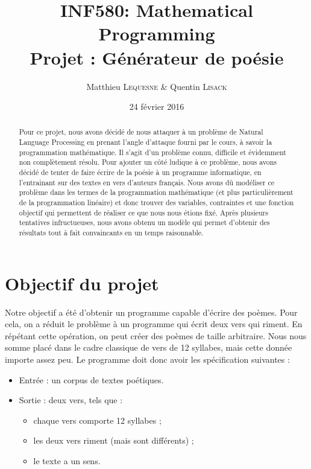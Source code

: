 \documentclass[a4paper,11pt]{article}
\title{INF580: Mathematical Programming \\ Projet : Générateur de poésie}
\author{Matthieu \textsc{Lequesne} \& Quentin \textsc{Lisack}}
\date{24 février 2016}
\begin{document}
\maketitle
\setcounter{tocdepth}{2}
\tableofcontents

\vspace{1cm}

\begin{abstract}
Pour ce projet, nous avons décidé de nous attaquer à un problème de Natural Language Processing en prenant l'angle d'attaque fourni par le cours, à savoir la programmation mathématique. Il s'agit d'un problème connu, difficile et évidemment non complètement résolu. Pour ajouter un côté 
ludique à ce problème, nous avons décidé de tenter de faire écrire de la poésie à un programme informatique, en l'entrainant sur des textes en vers d'auteurs français. 
Nous avons dû modéliser ce problème dans les termes de la programmation mathématique (et plus particulièrement de la programmation linéaire) 
et donc trouver des variables, contraintes et une fonction objectif qui permettent de réaliser ce que nous nous étions fixé. 
Après plusieurs tentatives infructueuses, nous avons obtenu un modèle qui permet d'obtenir des résultats tout à fait convaincants en un temps raisonnable.
\end{abstract}

\vfill

\newpage

\section{Objectif du projet}

Notre objectif a été d'obtenir un programme capable d'écrire des poèmes. Pour cela, on a réduit le problème à un programme qui écrit deux vers qui riment. En répétant cette opération, on peut créer des poèmes de taille arbitraire. Nous nous somme placé dans le cadre classique de vers de 12 syllabes, mais cette donnée importe assez peu. Le programme doit donc avoir les spécification suivantes :

\begin{itemize}
\item Entrée : un corpus de textes poétiques.
\item Sortie : deux vers, tels que :
\begin{itemize}
\item chaque vers comporte 12 syllabes ;
\item les deux vers riment (mais sont différents) ;
\item le texte a un sens.
\end{itemize}
\end{itemize}
\end{document}
